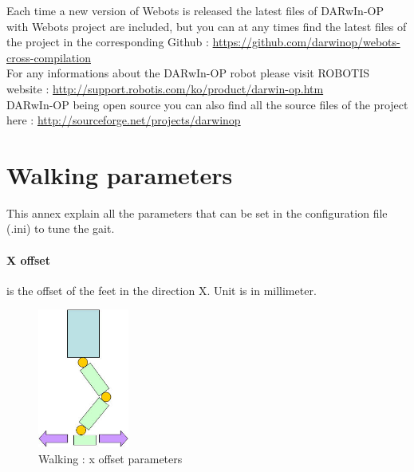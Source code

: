 \documentclass[a4paper, 12pt]{article}  		%
\begin{document}
Each time a new version of Webots is released the latest files of DARwIn-OP with Webots project are included, but you can at any times find the latest files of the project in the corresponding Github : \url{https://github.com/darwinop/webots-cross-compilation}\\

For any informations about the DARwIn-OP robot please visit ROBOTIS website : \url{http://support.robotis.com/ko/product/darwin-op.htm}\\

DARwIn-OP being open source you can also find all the source files of the project here : \url{http://sourceforge.net/projects/darwinop}\\


\appendix
\newpage
{} %


\section{Walking parameters} \label{sec:walkParameter}

This annex explain all the parameters that can be set in the configuration file (.ini) to tune the gait.\\ 

\paragraph*{X offset}
is the offset of the feet in the direction X. Unit is in millimeter.
\begin{figure}[H]
\begin{center}
\includegraphics[width=3cm]{x_offset.jpg}
\caption{Walking : x offset parameters}
\label{x_offset}
\end{center}
\end{figure}
\end{document}
